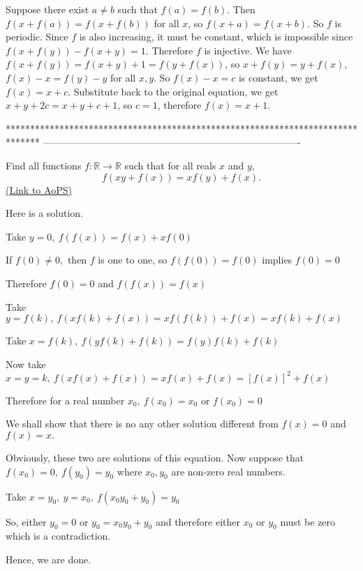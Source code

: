 \begin{solution}
	Suppose there exist $a\ne b$ such that $f(a)=f(b)$. Then $f(x+f(a))=f(x+f(b))$ for all $x$, so $f(x+a)=f(x+b)$. So $f$ is periodic. Since $f$ is also increasing, it must be constant, which is impossible since $f(x+f(y))-f(x+y)=1$. Therefore $f$ is injective. We have $f(x+f(y))=f(x+y)+1=f(y+f(x))$, so $x+f(y)=y+f(x)$, $f(x)-x=f(y)-y$ for all $x,y$. So $f(x)-x=c$ is constant, we get $f(x)=x+c$. Substitute back to the original equation, we get $x+y+2c=x+y+c+1$, so $c=1$, therefore $f(x)=x+1$.
\end{solution}
*******************************************************************************
-------------------------------------------------------------------------------

\begin{problem}
	Find all functions $f: \mathbb R \to \mathbb R$ such that for all reals $x$ and $y$,
\[f(xy+f(x))=xf(y)+f(x).\]
	\flushright \href{https://artofproblemsolving.com/community/c6h386678}{(Link to AoPS)}
\end{problem}



\begin{solution}
	Here is a solution.

Take $y=0, \: f(f(x))=f(x)+xf(0)$

If $f(0) \neq 0,$ then $f$ is one to one, so $f(f(0))=f(0)$ implies $f(0)=0$

Therefore $f(0)=0$ and $f(f(x))=f(x)$

Take $y=f(k), \: f(xf(k)+f(x))=xf(f(k))+f(x)=xf(k)+f(x)$

Take $x=f(k), \: f(yf(k)+f(k))=f(y)f(k)+f(k)$

Now take $x=y=k, \: f(xf(x)+f(x))=xf(x)+f(x)=[f(x)]^2+f(x)$

Therefore for a real number $x_0, \: f(x_0)=x_0$ or $f(x_0)=0$

We shall show that there is no any other solution different from $f(x)=0$ and $f(x)=x.$

Obviously, these two are solutions of this equation. Now suppose that $f(x_0)=0, \: f(y_0)=y_0$ where $x_0,y_0$ are non-zero real numbers. 

Take $x=y_0, \: y=x_0, \: f(x_0y_0+y_0)=y_0$

So, either $y_0=0$ or $y_0=x_0y_0+y_0$ and therefore either $x_0$ or $y_0$ must be zero which is a contradiction. 

Hence, we are done.
\end{solution}



